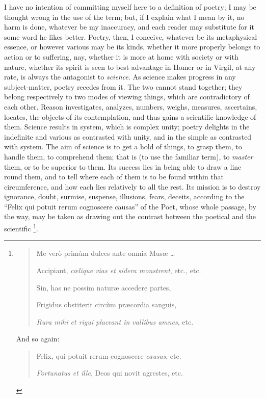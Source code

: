 I have no intention of committing myself here to a definition of
poetry; I may be thought wrong in the use of the term; but, if I
explain what I mean by it, no harm is done, whatever be my inaccuracy,
and each reader may substitute for it some word he likes better.
Poetry, then, I conceive, whatever be its metaphysical essence, or
however various may be its kinds, whether it more properly belongs to
action or to suffering, nay, whether it is more at home with society
or with nature, whether its spirit is seen to best advantage in Homer
or in Virgil, at any rate, is always the antagonist to \emph{science}.
As science makes progress in any subject-matter, poetry recedes from
it. The two cannot stand together; they belong respectively to two
modes of viewing things, which are contradictory of each other. Reason
investigates, analyzes, numbers, weighs, measures, ascertains,
locates, the objects of its contemplation, and thus gains a scientific
knowledge of them. Science results in system, which is complex unity;
poetry delights in the indefinite and various as contrasted with
unity, and in the simple as contrasted with system. The aim of science
is to get a hold of things, to grasp them, to handle them, to
comprehend them; that is (to use the familiar term), to \emph{master}
them, or to be superior to them. Its success lies in being able to
draw a line round them, and to tell where each of them is to be found
within that circumference, and how each lies relatively to all the
rest. Its mission is to destroy ignorance, doubt, surmise, suspense,
illusions, fears, deceits, according to the ``Felix qui potuit
rerum cognoscere causas'' of the Poet, whose whole passage, by the
way, may be taken as drawing out the contrast between the
poetical and the scientific \footnote{\begin{quote}

Me verò primùm dulces ante omnia Musæ …

Accipiant, \emph{cœlique vias et sidera monstrent}, etc., etc.

Sin, has ne possim naturæ accedere partes,

Frigidus obstiterit circùm præcordia sanguis,

\emph{Rura mihi et rigui placeant in vallibus amnes}, etc.

\end{quote}

And so again:

\begin{quote}

Felix, qui potuit rerum cognoscere \emph{causas}, etc.

\emph{Fortunatus et ille}, Deos qui novit agrestes, etc.

\end{quote}}.

